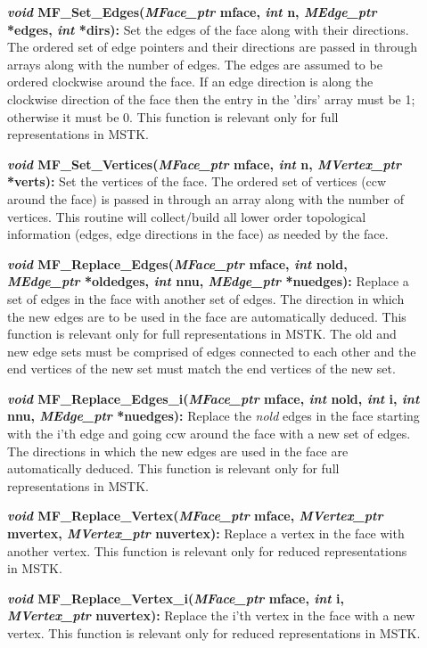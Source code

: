 \documentclass[12pt]{article}
\begin{document}
\begin{description}
\item[]{\bf {\em void} MF\_Set\_Edges({\em MFace\_ptr} mface,
{\em int} n, {\em MEdge\_ptr} *edges, {\em int} *dirs):} Set
the edges of the face along with their directions. The ordered set of
edge pointers and their directions are passed in through arrays along
with the number of edges. The edges are assumed to be ordered
clockwise around the face. If an edge direction is along the clockwise
direction of the face then the entry in the 'dirs' array must be 1;
otherwise it must be 0. This function is relevant only for full
representations in MSTK.

\item[]{\bf {\em void} MF\_Set\_Vertices({\em MFace\_ptr}
    mface, {\em int} n, {\em MVertex\_ptr} *verts):} Set the
  vertices of the face. The ordered set of vertices (ccw around the
  face) is passed in through an array along with the number of
  vertices. This routine will collect/build all lower order
  topological information (edges, edge directions in the face) as needed by the face.
  
\item[]{\bf {\em void} MF\_Replace\_Edges({\em MFace\_ptr} mface, {\em
      int} nold, {\em MEdge\_ptr} *oldedges, {\em int} nnu, {\em
      MEdge\_ptr} *nuedges):} Replace a set of edges in the face with
  another set of edges. The direction in which the new edges are to be
  used in the face are automatically deduced.  This function is
  relevant only for full representations in MSTK. The old and new edge
  sets must be comprised of edges connected to each other and the end
  vertices of the new set must match the end vertices of the new set.
  
\item[]{\bf {\em void} MF\_Replace\_Edges\_i({\em MFace\_ptr}
    mface, {\em int} nold, {\em int} i, {\em int} nnu,
    {\em MEdge\_ptr} *nuedges):} Replace the {\em nold} edges in
  the face starting with the i'th edge and going ccw around the face
  with a new set of edges. The directions in which the new edges are
  used in the face are automatically deduced. This function is
  relevant only for full representations in MSTK.

\item[]{\bf {\em void} MF\_Replace\_Vertex({\em MFace\_ptr} mface,
{\em MVertex\_ptr} mvertex, {\em MVertex\_ptr} nuvertex):}
Replace a vertex in the face with another vertex. This function is
relevant only for reduced representations in MSTK.

\item[]{\bf {\em void} MF\_Replace\_Vertex\_i({\em MFace\_ptr}
mface, {\em int} i, {\em MVertex\_ptr} nuvertex):} Replace the
i'th vertex in the face with a new vertex. This function is relevant
only for reduced representations in MSTK.


\end{description}
\end{document}
